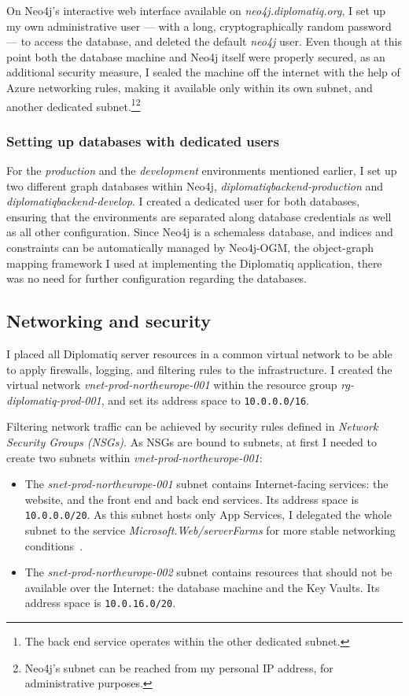 On Neo4j's interactive web interface available on \emph{neo4j.diplomatiq.org}, I set up my own administrative user — with a long, cryptographically random password — to access the database, and deleted the default \emph{neo4j} user. Even though at this point both the database machine and Neo4j itself were properly secured, as an additional security measure, I sealed the machine off the internet with the help of Azure networking rules, making it available only within its own subnet, and another dedicated subnet.\footnote{The back end service operates within the other dedicated subnet.}\footnote{Neo4j's subnet can be reached from my personal IP address, for administrative purposes.}

\subsubsection{Setting up databases with dedicated users}

For the \emph{production} and the \emph{development} environments mentioned earlier, I set up two different graph databases within Neo4j, \emph{diplomatiqbackend-production} and \emph{diplomatiqbackend-develop}. I created a dedicated user for both databases, ensuring that the environments are separated along database credentials as well as all other configuration. Since Neo4j is a schemaless database, and indices and constraints can be automatically managed by Neo4j-OGM, the object-graph mapping framework I used at implementing the Diplomatiq application, there was no need for further configuration regarding the databases.

\subsection{Networking and security}

I placed all Diplomatiq server resources in a common virtual network to be able to apply firewalls, logging, and filtering rules to the infrastructure. I created the virtual network \emph{vnet-prod-northeurope-001} within the resource group \emph{rg-diplomatiq-prod-001}, and set its address space to \lstinline{10.0.0.0/16}.

Filtering network traffic can be achieved by security rules defined in \emph{Network Security Groups (NSGs)}. As NSGs are bound to subnets, at first I needed to create two subnets within \emph{vnet-prod-northeurope-001}:

\begin{itemize}
\item The \emph{snet-prod-northeurope-001} subnet contains Internet-facing services: the website, and the front end and back end services. Its address space is \lstinline{10.0.0.0/20}. As this subnet hosts only App Services, I delegated the whole subnet to the service \emph{Microsoft.Web/serverFarms} for more stable networking conditions~\cite{subnetdelegation}.
\item The \emph{snet-prod-northeurope-002} subnet contains resources that should not be available over the Internet: the database machine and the Key Vaults. Its address space is \lstinline{10.0.16.0/20}.
\end{itemize}

